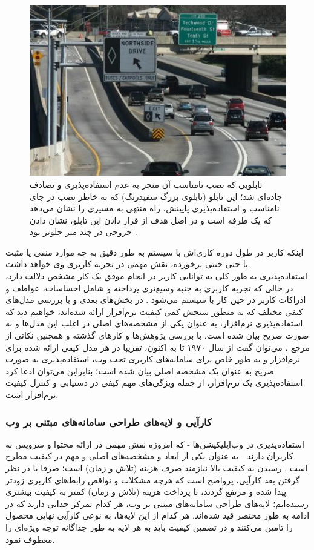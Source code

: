 \begin{figure}[H]
	\centering\includegraphics[width=14.8cm]{Resources/tabloo.JPG}
	\caption[تابلویی که نصب نامناسب آن منجر به عدم استفاده‌پذیری و تصادف جاده‌ای شد]
	{تابلویی که نصب نامناسب آن منجر به عدم استفاده‌پذیری و تصادف جاده‌ای شد؛ این تابلو (تابلوی بزرگ سفیدرنگ) که به خاطر نصب در جای نامناسب و استفاده‌پذیری پایینش، راه منتهی به مسیری را نشان می‌دهد که یک طرفه است و در اصل هدف از قرار دادن این تابلو، نشان دادن خروجی در چند متر جلوتر بود
		\cite{noauthor_bluffton_2018}.
	}
	\label{fig:bluffton}
\end{figure}
 اینکه کاربر در طول دوره کاری‌اش با سیستم به طور دقیق به چه موارد منفی یا مثبت یا حتی خنثی برخورده، نقش مهمی در تجربه کاربری وی خواهد داشت.\\
 استفاده‌پذیری به طور کلی به توانایی کاربر در انجام موفق یک کار مشخص دلالت دارد، در حالی که تجربه کاربری به جنبه وسیع‌تری پرداخته و شامل احساسات، عواطف و ادراکات کاربر در حین کار با سیستم می‌شود
 \cite{albert_measuring_2013}.
 در بخش‌های بعدی و با بررسی مدل‌های کیفی مختلف که به منظور سنجش کمی کیفیت نرم‌افزار ارائه شده‌اند، خواهیم دید که استفاده‌پذیری نرم‌افزار، به عنوان یکی از مشخصه‌های اصلی در اغلب این مدل‌ها و به صورت صریح  بیان شده است. با بررسی پژوهش‌ها و کارهای گذشته و همچنین نکاتی از مرجع
 \cite{pressman_software_2015}،
 می‌توان گفت از سال ۱۹۷۰ تا به اکنون، تقریبا در هر مدل کیفی ارائه شده برای نرم‌افزار و به طور خاص برای سامانه‌های کاربری تحت وب، استفاده‌پذیری به صورت صریح به عنوان یک مشخصه اصلی بیان شده است؛ بنابراین می‌توان ادعا کرد استفاده‌پذیری یک نرم‌افزار، از جمله ویژگی‌های مهم کیفی در دستیابی و کنترل کیفیت نرم‌افزار است.
 \subsubsection{کارآیی و لایه‌های طراحی سامانه‌های مبتنی بر وب}
 استفاده‌پذیری در وب‌اپلیکیشن‌ها - که امروزه نقش مهمی در ارائه محتوا و سرویس به کاربران دارند - به عنوان یکی از ابعاد و مشخصه‌های اصلی و مهم در کیفیت مطرح است
 \cite{pressman_software_2015}.
رسیدن به کیفیت بالا نیازمند صرف هزینه (تلاش و زمان) است؛ صرفا با در نظر گرفتن بعد کارآیی، پرواضح است که هرچه مشکلات و نواقص رابط‌های کاربری زودتر پیدا شده و مرتفع گردند، با پرداخت هزینه (تلاش و زمان) کمتر به کیفیت بیشتری رسیده‌ایم؛ لایه‌های طراحی سامانه‌های مبتنی بر وب، هر کدام تمرکز جدایی دارند که در ادامه به طور مختصر قید شده‌اند. هر کدام از این لایه‌ها، به نوعی کارآیی نهایی محصول را تامین می‌کنند و در تضمین کیفیت باید به هر لایه به طور جداگانه توجه ویژه‌ای را معطوف نمود.
